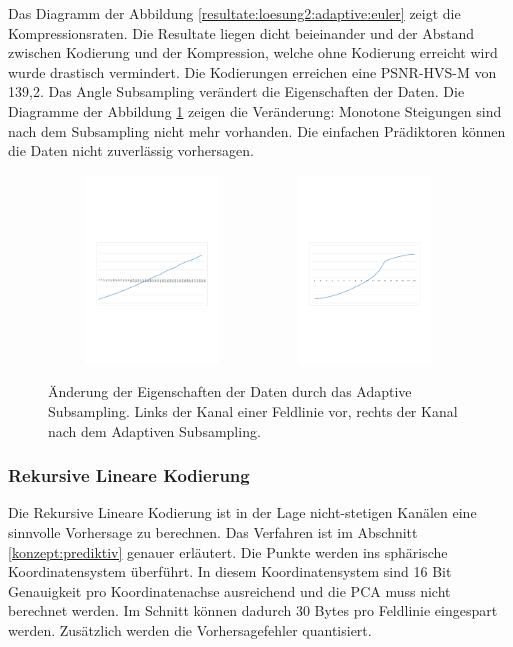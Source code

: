 Das Diagramm der Abbildung \ref{resultate:loesung2:adaptive:euler} zeigt die Kompressionsraten. Die Resultate liegen dicht beieinander und der Abstand zwischen Kodierung und der Kompression, welche ohne Kodierung erreicht wird wurde drastisch vermindert. Die Kodierungen erreichen eine PSNR-HVS-M von 139,2. Das Angle Subsampling verändert die Eigenschaften der Daten. Die Diagramme der Abbildung \ref{resultate:loesung2:adaptive:channel} zeigen die Veränderung: Monotone Steigungen sind nach dem Subsampling nicht mehr vorhanden. Die einfachen Prädiktoren können die Daten nicht zuverlässig vorhersagen.

\begin{figure}[!htbp]
	\center
	\includegraphics[trim = 1.8cm 9.5cm 1.8cm 11cm, clip=true,
width=0.49\textwidth,height=5cm,keepaspectratio]{./pictures/resultate/loesung2/variante1/channel_euler.pdf}
	\includegraphics[trim = 1.8cm 9.5cm 1.8cm 11cm, clip=true,
width=0.49\textwidth,height=5cm,keepaspectratio]{./pictures/resultate/loesung2/variante1/channel_angle.pdf}
	\caption{Änderung der Eigenschaften der Daten durch das Adaptive Subsampling. Links der Kanal einer Feldlinie vor, rechts der Kanal nach dem Adaptiven Subsampling.}
	\label{resultate:loesung2:adaptive:channel}
\end{figure}

\subsubsection{Rekursive Lineare Kodierung} \label{resultate:loesung2:wavelet}
Die Rekursive Lineare Kodierung ist in der Lage nicht-stetigen Kanälen eine sinnvolle Vorhersage zu berechnen. Das Verfahren ist im Abschnitt \ref{konzept:prediktiv} genauer erläutert. Die Punkte werden ins sphärische Koordinatensystem überführt. In diesem Koordinatensystem sind 16 Bit Genauigkeit pro Koordinatenachse ausreichend und die PCA muss nicht berechnet werden. Im Schnitt können dadurch 30 Bytes pro Feldlinie eingespart werden. Zusätzlich werden die Vorhersagefehler quantisiert.

